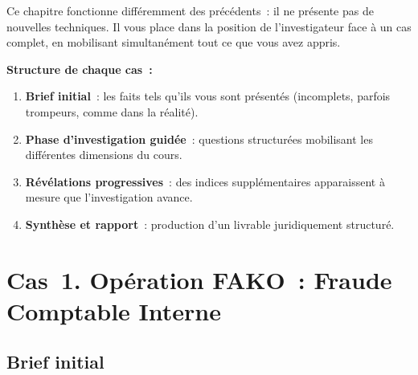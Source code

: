Ce chapitre fonctionne différemment des précédents~: il ne présente
pas de nouvelles techniques. Il vous place dans la position de
l'investigateur face à un cas complet, en mobilisant simultanément
tout ce que vous avez appris.

\textbf{Structure de chaque cas~:}
\begin{enumerate}
    \item \textbf{Brief initial}~: les faits tels qu'ils vous sont
          présentés (incomplets, parfois trompeurs, comme dans
          la réalité).
    \item \textbf{Phase d'investigation guidée}~: questions structurées
          mobilisant les différentes dimensions du cours.
    \item \textbf{Révélations progressives}~: des indices supplémentaires
          apparaissent à mesure que l'investigation avance.
    \item \textbf{Synthèse et rapport}~: production d'un livrable
          juridiquement structuré.
\end{enumerate}

\separateur

\section{Cas~1. Opération FAKO~: Fraude Comptable Interne}
\label{sec:cas-fako}

\subsection{Brief initial}


